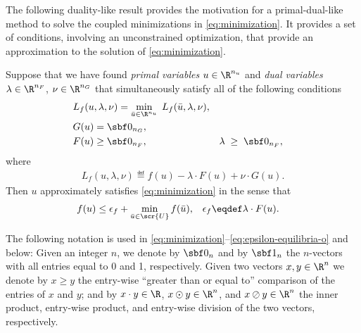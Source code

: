\documentclass[11pt]{article}
\begin{document}
The following duality-like result provides the motivation for a
primal-dual-like method to solve the coupled minimizations in
\eqref{eq:minimization}. It provides a set of
conditions, involving an unconstrained optimization, that provide an
approximation to the solution of \eqref{eq:minimization}.
\begin{lemma}\label{le:minima-gap}
  Suppose that we have found \emph{primal variables} $u\in\R^{n_u}$
  and \emph{dual variables} $\lambda\in\R^{n_F}$, $\nu\in\R^{n_G}$ that
  simultaneously satisfy all of the following
  conditions
  \begin{subequations}
    \begin{align}
      \label{eq:central-points}
      &L_f(u,\lambda,\nu) =\min_{\bar u\in\R^{n_u}}\; L_f(\bar u,\lambda,\nu), \\
      \label{eq:equality-constraints}
      &G(u)=\sbf 0_{n_G}, \\
      \label{eq:inequality-constraints}
      &F(u)\ge\sbf 0_{n_F}, &
      &\lambda\;\ge\;\sbf 0_{n_F}, &
    \end{align}
  \end{subequations}
  where
  \begin{align*}
    L_f(u,\lambda,\nu)\eqdef f(u)-\lambda\cdot F(u)+\nu\cdot G(u). 
  \end{align*}
  Then $u$ approximately
  satisfies \eqref{eq:minimization} in the sense that
  \begin{align}\label{eq:epsilon-equilibria-o}
    f(u)&\le\epsilon_f+\min_{\bar u\in\scr{U}} f(\bar u), &
    \epsilon_f&\eqdef \lambda\cdot F(u).
  \end{align}
  \frqed
\end{lemma}
The following notation is used in
\eqref{eq:minimization}--\eqref{eq:epsilon-equilibria-o} and below:
Given an integer $n$, we denote by $\sbf 0_n$ and by $\sbf 1_n$ the
$n$-vectors with all entries equal to 0 and 1, respectively. Given two
vectors $x,y\in\R^n$ we denote by $x\ge y$ the entry-wise ``greater than or
equal to'' comparison of the entries of $x$ and $y$; and by $x\cdot y\in\R$,
$x\odot y\in\R^n$, and $x\oslash y\in\R^n$ the inner product, entry-wise
product, and entry-wise division of the two vectors, respectively.
\end{document}
